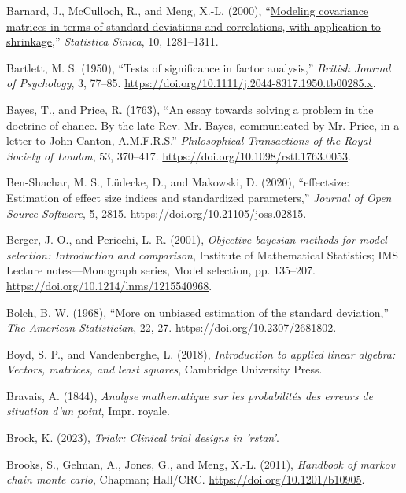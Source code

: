 \documentclass[
  10pt,
  a4paper,
  twoside]{article}
\newlength{\cslhangindent}
\newenvironment{CSLReferences}[2] %
 {\begin{list}{}{%
  \setlength{\itemindent}{0pt}
  \setlength{\leftmargin}{0pt}
  \setlength{\parsep}{0pt}
  \ifodd #1
   \setlength{\leftmargin}{\cslhangindent}
   \setlength{\itemindent}{-1\cslhangindent}
  \fi
  \setlength{\itemsep}{#2\baselineskip}}}
 {\end{list}}
\begin{document}
\begin{CSLReferences}{1}{0}
Barnard, J., McCulloch, R., and Meng, X.-L. (2000), {``\href{}{Modeling covariance matrices in terms of standard deviations and correlations, with application to shrinkage},''} \emph{Statistica Sinica}, 10, 1281--1311.

Bartlett, M. S. (1950), {``Tests of significance in factor analysis,''} \emph{British Journal of Psychology}, 3, 77--85. \url{https://doi.org/10.1111/j.2044-8317.1950.tb00285.x}.

Bayes, T., and Price, R. (1763), {``An essay towards solving a problem in the doctrine of chance. By the late {Rev. Mr. Baye}s, communicated by {Mr. Price}, in a letter to {John Canton}, {A.M.F.R.S.}''} \emph{Philosophical Transactions of the Royal Society of London}, 53, 370--417. \url{https://doi.org/10.1098/rstl.1763.0053}.

Ben-Shachar, M. S., Lüdecke, D., and Makowski, D. (2020), {``{e}ffectsize: Estimation of effect size indices and standardized parameters,''} \emph{Journal of Open Source Software}, 5, 2815. \url{https://doi.org/10.21105/joss.02815}.

Berger, J. O., and Pericchi, L. R. (2001), \emph{Objective bayesian methods for model selection: Introduction and comparison}, Institute of Mathematical Statistics; IMS Lecture notes---Monograph series, Model selection, pp. 135--207. \url{https://doi.org/10.1214/lnms/1215540968}.

Bolch, B. W. (1968), {``More on unbiased estimation of the standard deviation,''} \emph{The American Statistician}, 22, 27. \url{https://doi.org/10.2307/2681802}.

Boyd, S. P., and Vandenberghe, L. (2018), \emph{Introduction to applied linear algebra: Vectors, matrices, and least squares}, Cambridge University Press.

Bravais, A. (1844), \emph{Analyse mathematique sur les probabilités des erreurs de situation d'un point}, Impr. royale.

Brock, K. (2023), \emph{\href{https://CRAN.R-project.org/package=trialr}{Trialr: Clinical trial designs in 'rstan'}}.

Brooks, S., Gelman, A., Jones, G., and Meng, X.-L. (2011), \emph{Handbook of markov chain monte carlo}, Chapman; Hall/CRC. \url{https://doi.org/10.1201/b10905}.


\end{CSLReferences}
\end{document}
